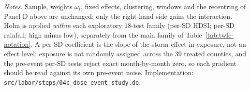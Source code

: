 \begin{table}[htbp]
\vspace{2pt}
\begin{minipage}{\textwidth}\scriptsize
\textit{Notes.} Sample, weights $\omega_i$, fixed effects, clustering, windows and the recentring of Panel D above are unchanged; only the right-hand side gains the interaction. Holm is applied \emph{within} each exploratory $18$-test family (per-SD HDSI; per-SD rainfall; high minus low), separately from the main family of Table~\ref{tab:twfe-notation}. A per-SD coefficient is the slope of the storm effect in exposure, not an effect level: exposure is not randomly assigned across the $39$ treated counties, and the pre-event per-SD tests reject exact month-by-month zero, so each gradient should be read against its own pre-event noise. Implementation: \texttt{src/labor/steps/04c\_dose\_event\_study.do}.
\end{minipage}
\end{table}

